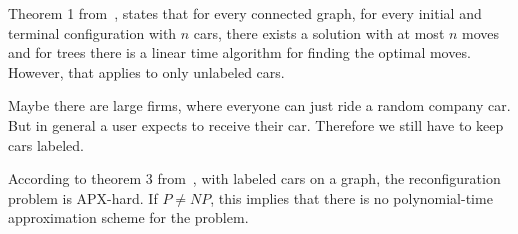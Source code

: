Theorem 1 from~\cite{calinescu2008reconfigurations}, states that for every
connected graph, for every initial and terminal configuration with $n$ cars,
there exists a solution with at most $n$ moves and for trees there is a linear
time algorithm for finding the optimal moves. However, that applies to only
unlabeled cars.

Maybe there are large firms, where everyone can just ride a random company car.
But in general a user expects to receive their car. Therefore we still
have to keep cars labeled. 

According to theorem 3 from~\cite{calinescu2008reconfigurations}, with labeled
cars on a graph, the reconfiguration problem is APX-hard. If $P\neq NP$, this
implies that there is no polynomial-time approximation scheme for the problem.
